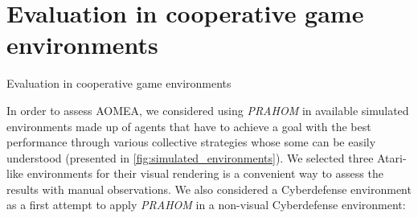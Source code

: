 \AtBeginSection[]{
    \begin{frame}
        \frametitle{}
        \tableofcontents[currentsection]
    \end{frame}
}


\section{Evaluation in cooperative game environments}

\begin{frame}{Evaluation in cooperative game environments}




    In order to assess AOMEA, we considered using \emph{PRAHOM} in available simulated environments made up of agents that have to achieve a goal with the best performance through various collective strategies whose some can be easily understood (presented in \autoref{fig:simulated_environments}).
    We selected three Atari-like environments for their visual rendering is a convenient way to assess the results with manual observations\footnotemark[1].
    We also considered a Cyberdefense environment as a first attempt to apply \emph{PRAHOM} in a non-visual Cyberdefense environment:




\end{frame}
